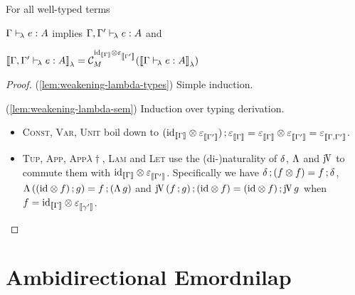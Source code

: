 \documentclass[runningheads,envcountsame]{llncs}
\newcommand{\monad}{M}
\begin{document}
\begin{lemma} For all well-typed terms
    \begin{lemmalist}
    \item \label{lem:weakening-lambda-types} $\Gamma \vdash_{\!\lambda} e : A$ implies $\Gamma, \Gamma' \vdash_{\!\lambda} e : A$ and
    \item \label{lem:weakening-lambda-sem} $\semL{\typerulel{\Gamma, \Gamma'}{e}{A}} = \C_\monad^{\tensor{\id_{\sem{\Gamma}}}{\terminal_{\sem{\Gamma'}}}}(\semL{\typerulel{\Gamma}{e}{A}})$
    \end{lemmalist}
\end{lemma}
\begin{proof}
    (\ref{lem:weakening-lambda-types}) Simple induction.
    
    (\ref{lem:weakening-lambda-sem}) Induction over typing derivation.
    \begin{itemize}
    \item \textsc{Const}, \textsc{Var}, \textsc{Unit} boil down to  $\comp{(\tensor{\id_{\sem{\Gamma}}}{\terminal_{\sem{\Gamma'}}})}{\terminal_{\sem{\Gamma}}} = \tensor{\terminal_{\sem{\Gamma}}}{\terminal_{\sem{\Gamma'}}} = \terminal_{\sem{\Gamma, \Gamma'}}$.
    \item \textsc{Tup}, \textsc{App}, \textsc{App$\lambda\dagger$}, \textsc{Lam} and \textsc{Let} use the (di-)naturality of $\dup$, $\curry$ and $\juncurry$ to commute them with $\tensor{\id_{\sem{\Gamma}}}{\terminal_{\sem{\Gamma'}}}$. Specifically we have $\comp{\dup}{(\tensor{f}{f})} = \comp{f}{\dup}$, $\curry\,(\comp{(\tensor{\id}{f})}{g}) = \comp{f}{(\curry\,g)}$ and $\comp{\juncurry\,(\comp{f}{g})}{(\tensor{\id}{f})} = \comp{(\tensor{\id}{f})}{\juncurry\,g}$ when $f = \tensor{\id_{\sem{\Gamma}}}{\terminal_{\sem{\gamma'}}}$.
    \end{itemize}
\end{proof}

\section{Ambidirectional Emordnilap}
\end{document}
